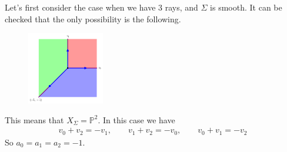 \documentclass[a4paper,12pt]{amsart}
\newcommand{\PP}{\mathbb{P}}
\begin{document}
\begin{example}
	Let's first consider the case when we have 3 rays, and $\Sigma$ is smooth. It can be checked that the only possibility is the following.
	\vspace{5cm}
	\begin{figure}[h]
		\centering
		\includegraphics[width=0.3\textwidth]{pic/Mar21_fan4}
	\end{figure}
	
	This means that $X_\Sigma=\PP^2$. In this case we have
	\begin{align*}
	v_0+v_2=-v_1,\qquad v_1+v_2=-v_0,\qquad v_0+v_1=-v_2
	\end{align*}
	So $a_0=a_1=a_2=-1$.
\end{example}
\end{document}
